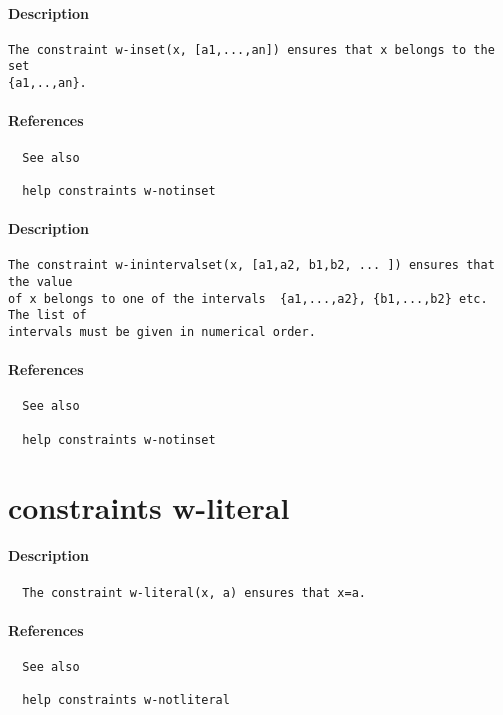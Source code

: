 \paragraph{Description}
{\footnotesize
\begin{verbatim}
The constraint w-inset(x, [a1,...,an]) ensures that x belongs to the set 
{a1,..,an}.
\end{verbatim}
}
\paragraph{References}
{\footnotesize
\begin{verbatim}
  See also

  help constraints w-notinset
\end{verbatim}
}
\paragraph{Description}
{\footnotesize
\begin{verbatim}
The constraint w-inintervalset(x, [a1,a2, b1,b2, ... ]) ensures that the value 
of x belongs to one of the intervals  {a1,...,a2}, {b1,...,b2} etc. The list of 
intervals must be given in numerical order. 
\end{verbatim}
}
\paragraph{References}
{\footnotesize
\begin{verbatim}
  See also

  help constraints w-notinset
\end{verbatim}
}
\section{constraints w-literal}
\paragraph{Description}
{\footnotesize
\begin{verbatim}
  The constraint w-literal(x, a) ensures that x=a.
\end{verbatim}
}
\paragraph{References}
{\footnotesize
\begin{verbatim}
  See also

  help constraints w-notliteral
\end{verbatim}
}
